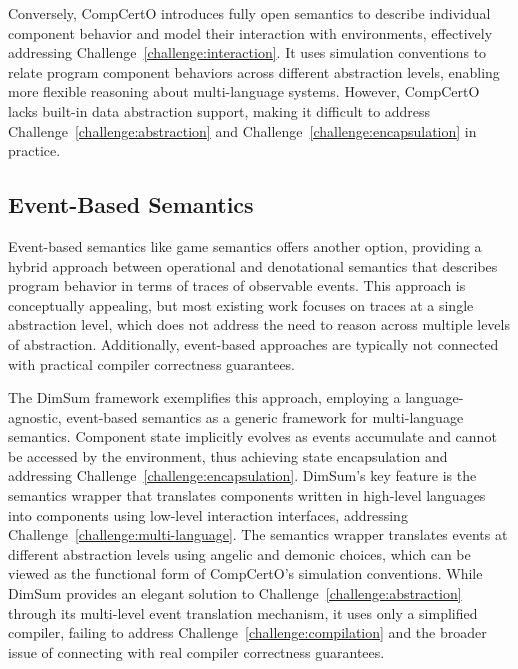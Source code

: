 Conversely, CompCertO \citep{compcerto} introduces fully open semantics
to describe individual component behavior
and model their interaction with environments,
effectively addressing Challenge~\ref{challenge:interaction}.
It uses simulation conventions to relate
program component behaviors
across different abstraction levels,
enabling more flexible reasoning
about multi-language systems.
However, CompCertO lacks built-in data abstraction support,
making it difficult to address Challenge~\ref{challenge:abstraction}
and Challenge~\ref{challenge:encapsulation}
in practice.

\subsection{Event-Based Semantics}

Event-based semantics like game semantics offers another option,
providing a hybrid approach between operational and denotational semantics
that describes program behavior in terms of traces of observable events.
This approach is conceptually appealing,
but most existing work focuses on traces at a single abstraction level,
which does not address the need to reason across multiple levels of abstraction.
Additionally, event-based approaches are typically not connected
with practical compiler correctness guarantees.

The DimSum framework \citep{dimsum}
exemplifies this approach,
employing a language-agnostic, event-based semantics
as a generic framework for multi-language semantics.
Component state implicitly evolves as events accumulate
and cannot be accessed by the environment,
thus achieving state encapsulation
and addressing Challenge~\ref{challenge:encapsulation}.
DimSum's key feature is the semantics wrapper
that translates components written in high-level languages
into components using low-level interaction interfaces,
addressing Challenge~\ref{challenge:multi-language}.
The semantics wrapper translates events
at different abstraction levels
using angelic and demonic choices,
which can be viewed as
the functional form of CompCertO's simulation conventions.
While DimSum provides an elegant solution to Challenge~\ref{challenge:abstraction}
through its multi-level event translation mechanism,
it uses only a simplified compiler,
failing to address Challenge~\ref{challenge:compilation}
and the broader issue of connecting with real compiler correctness guarantees.


